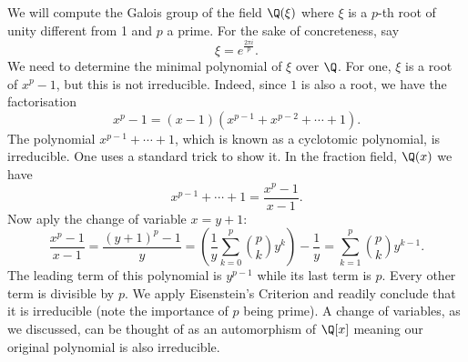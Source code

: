 \documentclass[12pt,oneside]{book}
\begin{document}
\begin{example}
	We will compute the Galois group of the field \( \Q(\xi) \) where \( \xi \) is a \( p
	\)-th root of unity different from 1 and \( p \) a prime. For the sake of concreteness,
	say
	\begin{equation*}
		\xi = e^{\frac{2\pi i}{p}}.
	\end{equation*}
	We need to determine the minimal polynomial of \( \xi \) over \( \Q \). For one, \( \xi
	\) is a root of \( x^p -1 \), but this is not irreducible. Indeed, since \( 1 \) is also
	a root, we have the factorisation
	\begin{equation*}
		x^p - 1 = (x - 1)(x^{p-1} + x^{p-2} + \cdots + 1).
	\end{equation*}
	The polynomial \( x^{p-1} + \cdots + 1 \), which is known as a cyclotomic polynomial, is
	irreducible. One uses a standard trick to show it. In the fraction field, \( \Q(x) \) we
	have
	\begin{equation*}
		x^{p-1} + \cdots + 1 = \frac{x^p - 1}{x - 1}.
	\end{equation*}
	Now aply the change of variable \( x = y + 1 \):
	\begin{equation*}
		\frac{x^p - 1}{x - 1} = \frac{(y + 1)^p - 1}{y} = \left(\frac{1}{y}\sum_{k = 0}^{p}
		\binom{p}{k}y^k\right) - \frac{1}{y} = \sum_{k = 1}^{p}\binom{p}{k}y^{k-1}.
	\end{equation*}
	The leading term of this polynomial is \( y^{p-1} \) while its last term is \( p \).
	Every other term is divisible by \( p \). We apply Eisenstein's Criterion and readily
	conclude that it is irreducible (note the importance of \( p \) being prime). A change
	of variables, as we discussed, can be thought of as an automorphism of \( \Q[x] \)
	meaning our original polynomial is also irreducible.


\end{example}
\end{document}
